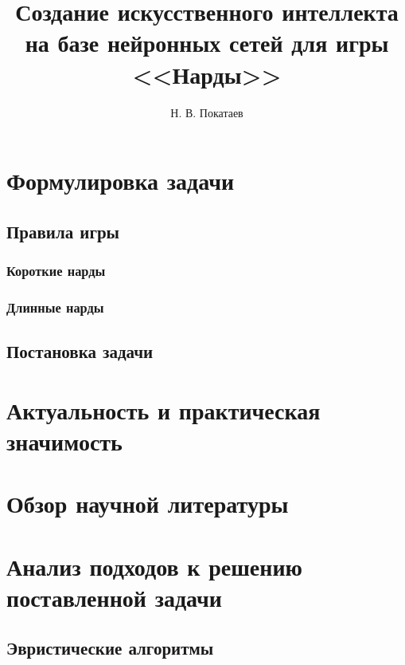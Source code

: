 \documentclass{vsureport}
\title{Создание искусственного интеллекта на базе нейронных сетей для игры <<Нарды>>}
\author{Н. В. Покатаев}
\begin{document}
\maketitle

\tableofcontents



\section{Формулировка задачи}


\subsection{Правила игры}


\subsubsection{Короткие нарды}


\subsubsection{Длинные нарды}


\subsection{Постановка задачи}


\section{Актуальность и практическая значимость}


\section{Обзор научной литературы}


\section{Анализ подходов к решению поставленной задачи}

\subsection{Эвристические алгоритмы}

\end{document}
